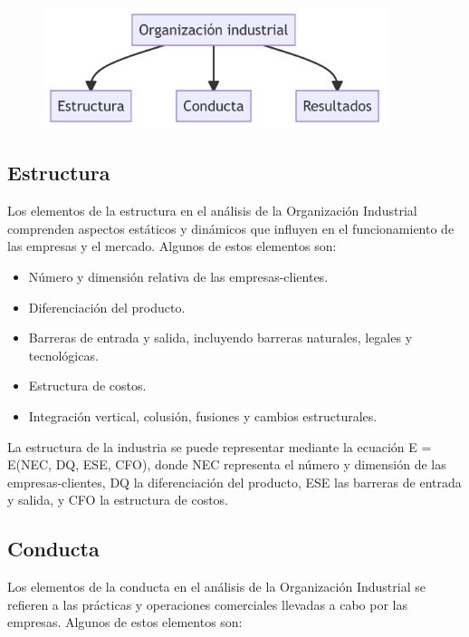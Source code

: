 \documentclass[
  a4paper,
]{article}
\providecommand{\tightlist}{%
  \setlength{\itemsep}{0pt}\setlength{\parskip}{0pt}}\usepackage{longtable,booktabs,array}
\begin{document}
\begin{figure}[H]

{\centering \includegraphics[width=3.94in,height=1.4in]{index_files/figure-latex/mermaid-figure-1.png}

}

\end{figure}

\hypertarget{estructura}{%
\subsection{Estructura}\label{estructura}}

Los elementos de la estructura en el análisis de la Organización
Industrial comprenden aspectos estáticos y dinámicos que influyen en el
funcionamiento de las empresas y el mercado. Algunos de estos elementos
son:

\begin{itemize}
\tightlist
\item
  Número y dimensión relativa de las empresas-clientes.
\item
  Diferenciación del producto.
\item
  Barreras de entrada y salida, incluyendo barreras naturales, legales y
  tecnológicas.
\item
  Estructura de costos.
\item
  Integración vertical, colusión, fusiones y cambios estructurales.
\end{itemize}

La estructura de la industria se puede representar mediante la ecuación
E = E(NEC, DQ, ESE, CFO), donde NEC representa el número y dimensión de
las empresas-clientes, DQ la diferenciación del producto, ESE las
barreras de entrada y salida, y CFO la estructura de costos.

\hypertarget{conducta}{%
\subsection{Conducta}\label{conducta}}

Los elementos de la conducta en el análisis de la Organización
Industrial se refieren a las prácticas y operaciones comerciales
llevadas a cabo por las empresas. Algunos de estos elementos son:
\end{document}

